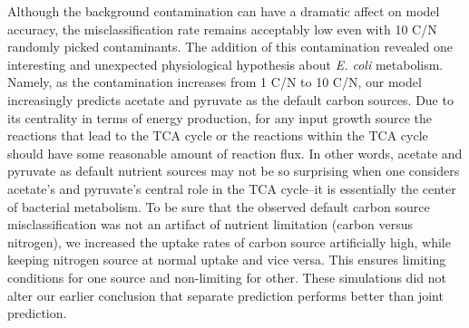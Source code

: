 \documentclass[12pt]{article}
\begin{document}
Although the background contamination can have a dramatic affect on model accuracy, the misclassification rate remains acceptably low even with 10 C/N randomly picked contaminants. The addition of this contamination revealed one interesting and unexpected physiological hypothesis about \emph{E. coli} metabolism. Namely, as the contamination increases from 1 C/N to 10 C/N, our model increasingly predicts acetate and pyruvate as the default carbon sources. Due to its centrality in terms of energy production, for any input growth source the reactions that lead to the TCA cycle or the reactions within the TCA cycle should have some reasonable amount of reaction flux. In other words, acetate and pyruvate as default nutrient sources may not be so surprising when one considers acetate's and pyruvate's central role in the TCA cycle--it is essentially the center of bacterial metabolism. To be sure that the observed default carbon source misclassification was not an artifact of nutrient limitation (carbon versus nitrogen), we increased the uptake rates of carbon source artificially high, while keeping nitrogen source at normal uptake and vice versa. This ensures limiting conditions for one source and non-limiting for other. These simulations did not alter our earlier conclusion that separate prediction performs better than joint prediction.


\end{document}
